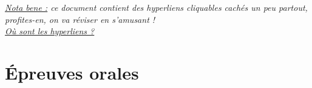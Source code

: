 \documentclass{article}
\begin{document}


\newpage

\tableofcontents

\vspace{5cm}

\textit{\uline{Nota bene :} ce document contient des hyperliens cliquables cachés un peu partout, profites-en, on va réviser en s'amusant !\\
\href{https://www.youtube.com/shorts/475so-5icRg}{Où sont les hyperliens ?}
}

\newpage





\section{\'Epreuves orales}












\end{document}
